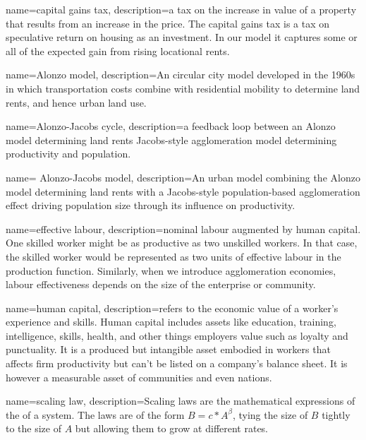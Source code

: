 {
name=capital gains tax,
description={a tax on the increase in value of a property that results from an increase in the price. The capital gains tax is a tax on speculative return on housing as an investment. In our model it captures some or all of the expected gain from rising \glspl{locational rent}.}
}

{
name=Alonzo model,
description={An circular city model developed in the 1960s in which transportation costs combine with residential mobility to determine land rents, and hence urban land use.}
}

{
name=Alonzo-Jacobs cycle,
description={a feedback loop between an \Gls{Alonzo model} determining land rents Jacobs-style \gls{agglomeration} model determining productivity and population.}
}

{
name= Alonzo-Jacobs model,
description={An urban model combining the Alonzo \cite{alonsoModelUrbanLand1960}model determining land rents with a Jacobs-style population-based \gls{agglomeration} effect \cite{jacobsEconomyCities1969} driving population size through its influence on productivity.}
}


{
name=effective labour,
description={nominal labour augmented by \gls{human capital}. One skilled worker might be as productive as two unskilled workers. In that case,  the skilled worker would be represented as two units of effective labour in the  \gls{production function}. Similarly, when we introduce \gls{agglomeration} economies, labour effectiveness depends on the size of the enterprise or community.}
}


{
name=human capital,
description={refers to the economic value of a worker's experience and skills. Human capital includes assets like education, training, intelligence, skills, health, and other things employers value such as loyalty and punctuality. It is a produced but intangible asset embodied in workers that affects firm productivity but can't be listed on a company's balance sheet. It is however a measurable asset of communities and even nations.}
}

{
name=scaling law,
description={Scaling laws are the mathematical expressions of the  
of a system. The laws are of the form  $B=c*A^\beta$, tying the size of $B$ tightly to the size of $A$ but allowing them to grow at different rates.}
}

